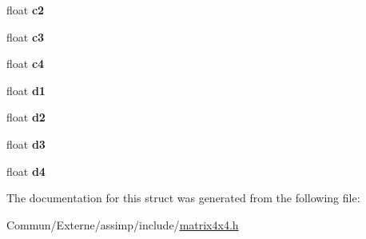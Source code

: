 \begin{DoxyCompactItemize}
\item 
float {\bfseries c2}\hypertarget{structai_matrix4x4_a67425f81054b1097c29b73bf317cfeeb}{}\label{structai_matrix4x4_a67425f81054b1097c29b73bf317cfeeb}

\item 
float {\bfseries c3}\hypertarget{structai_matrix4x4_aec8c5745b90139d472eb4e91f1373c1a}{}\label{structai_matrix4x4_aec8c5745b90139d472eb4e91f1373c1a}

\item 
float {\bfseries c4}\hypertarget{structai_matrix4x4_a7e3288f38a4e00d55c02272e1582e462}{}\label{structai_matrix4x4_a7e3288f38a4e00d55c02272e1582e462}

\item 
float {\bfseries d1}\hypertarget{structai_matrix4x4_a13f3800d9106e3be6d0e60b794c5a5ae}{}\label{structai_matrix4x4_a13f3800d9106e3be6d0e60b794c5a5ae}

\item 
float {\bfseries d2}\hypertarget{structai_matrix4x4_a6f17ca1c7e4b9377d0e332f85aab282b}{}\label{structai_matrix4x4_a6f17ca1c7e4b9377d0e332f85aab282b}

\item 
float {\bfseries d3}\hypertarget{structai_matrix4x4_a8d2910f62b34b1e2ace93b55e4db4b92}{}\label{structai_matrix4x4_a8d2910f62b34b1e2ace93b55e4db4b92}

\item 
float {\bfseries d4}\hypertarget{structai_matrix4x4_ac0a65b51f126f7331b4f7dbbd82f3d63}{}\label{structai_matrix4x4_ac0a65b51f126f7331b4f7dbbd82f3d63}

\end{DoxyCompactItemize}


The documentation for this struct was generated from the following file\+:\begin{DoxyCompactItemize}
\item 
Commun/\+Externe/assimp/include/\hyperlink{matrix4x4_8h}{matrix4x4.\+h}\end{DoxyCompactItemize}
